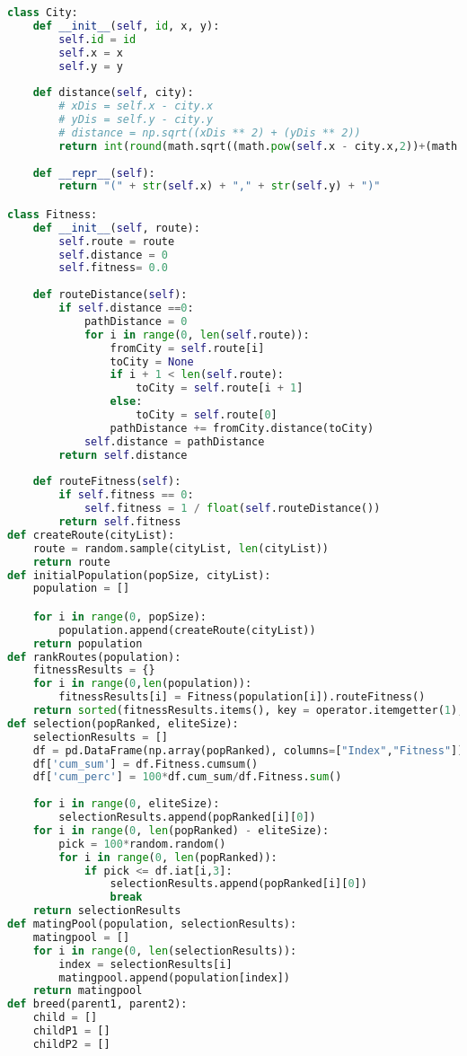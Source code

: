 \begin{lstlisting}[language=Python]
class City:
    def __init__(self, id, x, y):
        self.id = id
        self.x = x
        self.y = y
    
    def distance(self, city):
        # xDis = self.x - city.x
        # yDis = self.y - city.y
        # distance = np.sqrt((xDis ** 2) + (yDis ** 2))
        return int(round(math.sqrt((math.pow(self.x - city.x,2))+(math.pow(self.y - city.y,2)))))
    
    def __repr__(self):
        return "(" + str(self.x) + "," + str(self.y) + ")"

class Fitness:
    def __init__(self, route):
        self.route = route
        self.distance = 0
        self.fitness= 0.0
    
    def routeDistance(self):
        if self.distance ==0:
            pathDistance = 0
            for i in range(0, len(self.route)):
                fromCity = self.route[i]
                toCity = None
                if i + 1 < len(self.route):
                    toCity = self.route[i + 1]
                else:
                    toCity = self.route[0]
                pathDistance += fromCity.distance(toCity)
            self.distance = pathDistance
        return self.distance
    
    def routeFitness(self):
        if self.fitness == 0:
            self.fitness = 1 / float(self.routeDistance())
        return self.fitness
def createRoute(cityList):
    route = random.sample(cityList, len(cityList))
    return route
def initialPopulation(popSize, cityList):
    population = []

    for i in range(0, popSize):
        population.append(createRoute(cityList))
    return population
def rankRoutes(population):
    fitnessResults = {}
    for i in range(0,len(population)):
        fitnessResults[i] = Fitness(population[i]).routeFitness()
    return sorted(fitnessResults.items(), key = operator.itemgetter(1), reverse = True)
def selection(popRanked, eliteSize):
    selectionResults = []
    df = pd.DataFrame(np.array(popRanked), columns=["Index","Fitness"])
    df['cum_sum'] = df.Fitness.cumsum()
    df['cum_perc'] = 100*df.cum_sum/df.Fitness.sum()
    
    for i in range(0, eliteSize):
        selectionResults.append(popRanked[i][0])
    for i in range(0, len(popRanked) - eliteSize):
        pick = 100*random.random()
        for i in range(0, len(popRanked)):
            if pick <= df.iat[i,3]:
                selectionResults.append(popRanked[i][0])
                break
    return selectionResults
def matingPool(population, selectionResults):
    matingpool = []
    for i in range(0, len(selectionResults)):
        index = selectionResults[i]
        matingpool.append(population[index])
    return matingpool
def breed(parent1, parent2):
    child = []
    childP1 = []
    childP2 = []
    

\end{lstlisting}
